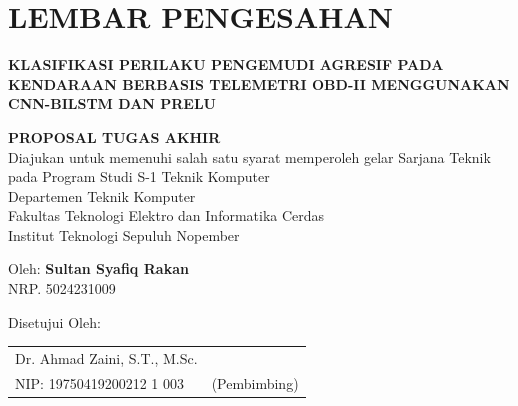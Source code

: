 \chapter*{LEMBAR PENGESAHAN}

\thispagestyle{empty}

\begin{center}
  \textbf{KLASIFIKASI PERILAKU PENGEMUDI AGRESIF PADA KENDARAAN BERBASIS TELEMETRI OBD-II MENGGUNAKAN CNN-BILSTM DAN PRELU}
\end{center}

\begingroup
\small

\begin{center}
  \textbf{PROPOSAL TUGAS AKHIR} \\
  Diajukan untuk memenuhi salah satu syarat memperoleh gelar
  Sarjana Teknik pada
  Program Studi S-1 Teknik Komputer \\
  Departemen Teknik Komputer \\
  Fakultas Teknologi Elektro dan Informatika Cerdas \\
  Institut Teknologi Sepuluh Nopember
\end{center}

\begin{center}
  Oleh: \textbf{Sultan Syafiq Rakan} \\
  NRP. 5024231009
\end{center}

\begin{center}
  Disetujui Oleh:
\end{center}

\vspace{10ex}

\begingroup
\setlength{\tabcolsep}{0pt}

\noindent
\begin{tabularx}{\textwidth}{X c}
  Dr. Ahmad Zaini, S.T., M.Sc.      &                 \\
  NIP: 19750419200212 1 003    & (Pembimbing)    \\
\end{tabularx}
\endgroup

\vspace{\fill}

